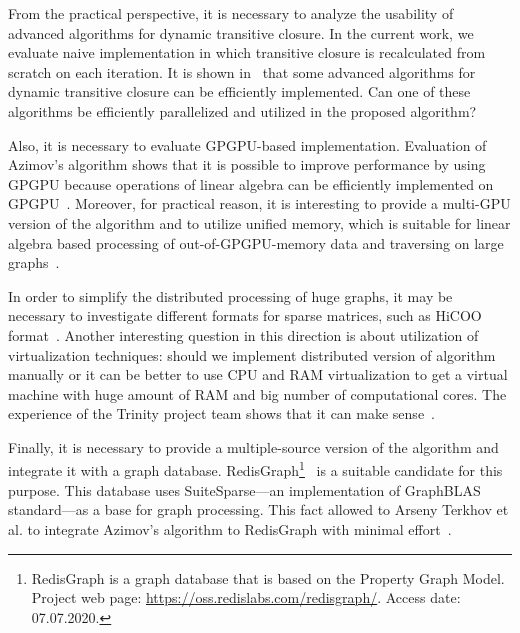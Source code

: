 
From the practical perspective, it is necessary to analyze the usability of advanced algorithms for dynamic transitive closure.
In the current work, we evaluate naive implementation in which transitive closure is recalculated from scratch on each iteration.
It is shown in~\cite{cs6345} that some advanced algorithms for dynamic transitive closure can be efficiently implemented.
Can one of these algorithms be efficiently parallelized and utilized in the proposed algorithm?

Also, it is necessary to evaluate GPGPU-based implementation.
Evaluation of Azimov's algorithm shows that it is possible to improve performance by using GPGPU because operations of linear algebra can be efficiently implemented on GPGPU~\cite{Mishin:2019:ECP:3327964.3328503,10.1145/3398682.3399163}.
Moreover, for practical reason, it is interesting to provide a multi-GPU version of the algorithm and to utilize unified memory, which is suitable for linear algebra based processing of out-of-GPGPU-memory data and traversing on large graphs~\cite{8946118,10.14778/3384345.3384358}.

In order to simplify the distributed processing of huge graphs, it may be necessary to investigate different formats for sparse matrices, such as HiCOO format~\cite{10.5555/3291656.3291682}.
Another interesting question in this direction is about utilization of virtualization techniques: should we implement distributed version of algorithm manually or it can be better to use CPU and RAM virtualization to get a virtual machine with huge amount of RAM and big number of computational cores.
The experience of the Trinity project team shows that it can make sense~\cite{10.1145/2463676.2467799}.

Finally, it is necessary to provide a multiple-source version of the algorithm and integrate it with a graph database.
RedisGraph\footnote{RedisGraph is a graph database that is based on the Property Graph
Model. Project web page: \url{https://oss.redislabs.com/redisgraph/}. Access date:
07.07.2020.}~\cite{8778293} is a suitable candidate for this purpose.
This database uses SuiteSparse---an implementation of GraphBLAS standard---as a base for graph processing.
This fact allowed to Arseny Terkhov et al.  to integrate Azimov's algorithm to RedisGraph with minimal effort~\cite{10.1145/3398682.3399163}.
